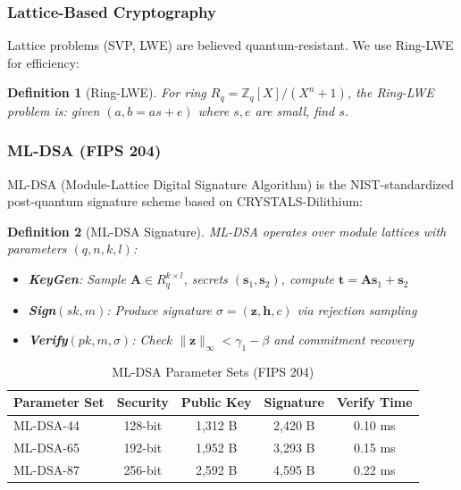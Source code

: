 \documentclass[11pt,a4paper]{article}
\newtheorem{definition}{Definition}
\begin{document}
\subsubsection{Lattice-Based Cryptography}

Lattice problems (SVP, LWE) are believed quantum-resistant. We use Ring-LWE for efficiency:

\begin{definition}[Ring-LWE]
For ring $R_q = \mathbb{Z}_q[X]/(X^n+1)$, the Ring-LWE problem is: given $(a, b = as + e)$ where $s, e$ are small, find $s$.
\end{definition}

\subsubsection{ML-DSA (FIPS 204)}

ML-DSA (Module-Lattice Digital Signature Algorithm) is the NIST-standardized post-quantum signature scheme based on CRYSTALS-Dilithium:

\begin{definition}[ML-DSA Signature]
ML-DSA operates over module lattices with parameters $(q, n, k, l)$:
\begin{itemize}
    \item \textbf{KeyGen}: Sample $\mathbf{A} \in R_q^{k \times l}$, secrets $(\mathbf{s}_1, \mathbf{s}_2)$, compute $\mathbf{t} = \mathbf{A}\mathbf{s}_1 + \mathbf{s}_2$
    \item \textbf{Sign$(sk, m)$}: Produce signature $\sigma = (\mathbf{z}, \mathbf{h}, c)$ via rejection sampling
    \item \textbf{Verify$(pk, m, \sigma)$}: Check $\|\mathbf{z}\|_\infty < \gamma_1 - \beta$ and commitment recovery
\end{itemize}
\end{definition}

\begin{table}[h]
\centering
\caption{ML-DSA Parameter Sets (FIPS 204)}
\begin{tabular}{@{}lcccc@{}}
\toprule
Parameter Set & Security & Public Key & Signature & Verify Time \\
\midrule
ML-DSA-44 & 128-bit & 1,312 B & 2,420 B & 0.10 ms \\
ML-DSA-65 & 192-bit & 1,952 B & 3,293 B & 0.15 ms \\
ML-DSA-87 & 256-bit & 2,592 B & 4,595 B & 0.22 ms \\
\bottomrule
\end{tabular}
\end{table}
\end{document}
